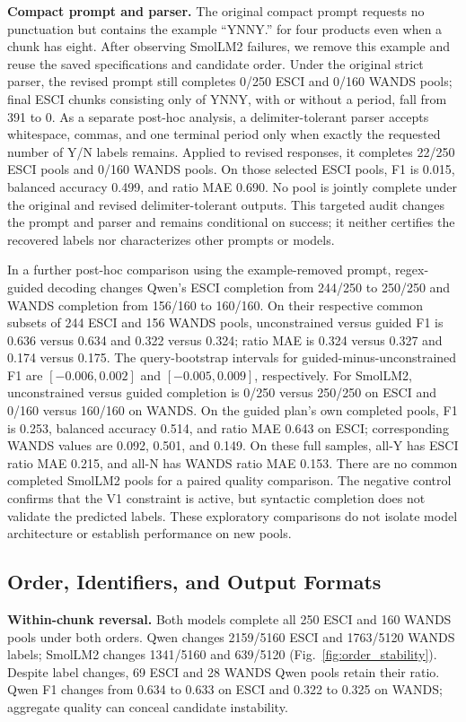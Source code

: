 \documentclass[conference]{IEEEtran}
\begin{document}
\textbf{Compact prompt and parser.}
The original compact prompt requests no punctuation but contains the example ``YNNY.'' for four products even when a chunk has eight. After observing SmolLM2 failures, we remove this example and reuse the saved specifications and candidate order. Under the original strict parser, the revised prompt still completes 0/250 ESCI and 0/160 WANDS pools; final ESCI chunks consisting only of YNNY, with or without a period, fall from 391 to 0. As a separate post-hoc analysis, a delimiter-tolerant parser accepts whitespace, commas, and one terminal period only when exactly the requested number of Y/N labels remains. Applied to revised responses, it completes 22/250 ESCI pools and 0/160 WANDS pools. On those selected ESCI pools, F1 is 0.015, balanced accuracy 0.499, and ratio MAE 0.690. No pool is jointly complete under the original and revised delimiter-tolerant outputs. This targeted audit changes the prompt and parser and remains conditional on success; it neither certifies the recovered labels nor characterizes other prompts or models.

In a further post-hoc comparison using the example-removed prompt, regex-guided decoding changes Qwen's ESCI completion from 244/250 to 250/250 and WANDS completion from 156/160 to 160/160. On their respective common subsets of 244 ESCI and 156 WANDS pools, unconstrained versus guided F1 is 0.636 versus 0.634 and 0.322 versus 0.324; ratio MAE is 0.324 versus 0.327 and 0.174 versus 0.175. The query-bootstrap intervals for guided-minus-unconstrained F1 are $[-0.006,0.002]$ and $[-0.005,0.009]$, respectively. For SmolLM2, unconstrained versus guided completion is 0/250 versus 250/250 on ESCI and 0/160 versus 160/160 on WANDS. On the guided plan's own completed pools, F1 is 0.253, balanced accuracy 0.514, and ratio MAE 0.643 on ESCI; corresponding WANDS values are 0.092, 0.501, and 0.149. On these full samples, all-Y has ESCI ratio MAE 0.215, and all-N has WANDS ratio MAE 0.153. There are no common completed SmolLM2 pools for a paired quality comparison. The negative control confirms that the V1 constraint is active, but syntactic completion does not validate the predicted labels. These exploratory comparisons do not isolate model architecture or establish performance on new pools.

\subsection{Order, Identifiers, and Output Formats}
\textbf{Within-chunk reversal.}
Both models complete all 250 ESCI and 160 WANDS pools under both orders. Qwen changes 2159/5160 ESCI and 1763/5120 WANDS labels; SmolLM2 changes 1341/5160 and 639/5120 (Fig.~\ref{fig:order_stability}). Despite label changes, 69 ESCI and 28 WANDS Qwen pools retain their ratio. Qwen F1 changes from 0.634 to 0.633 on ESCI and 0.322 to 0.325 on WANDS; aggregate quality can conceal candidate instability.
\end{document}
